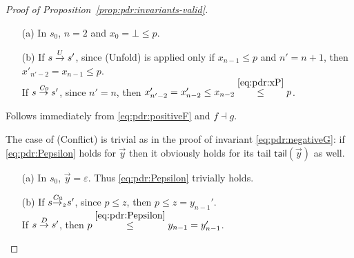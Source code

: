 \begin{proof}[Proof of Proposition~\ref{prop:pdr:invariants-valid}]
	\begin{itemize}
		\item[(a)] In $s_0$, $n=2$ and $x_{0}= \bot \leq p$.
		\item[(b)] If $s \stackrel{U}{\to} s'$, since (Unfold) is applied only if $x_{n-1}\leq p$ and $n'=n+1$, then $x'_{n'-2}=x_{n-1} \leq p$. \\
		      If $s \stackrel{\mathit{Co}}{\to} s'$, since $n'=n$, then $x_{n'-2}'= x_{n-2}'  \leq x_{n-2} \stackrel{{\eqref{eq:pdr:xP}}}{\leq} p$.
	\end{itemize}

	\newline\noindent
	Follows immediately from \eqref{eq:pdr:positiveF} and $f \dashv g$.

	\newline\noindent
	The case of (Conflict) is trivial as in the proof of invariant \eqref{eq:pdr:negativeG}: if \eqref{eq:pdr:Pepsilon} holds for $\vec{y}$ then it obviously holds for its tail $\mathsf{tail}(\vec{y})$ as well.
	\begin{itemize}
		\item[(a)] In $s_0$, $\vec{y}= \varepsilon$. Thus \eqref{eq:pdr:Pepsilon} trivially holds.
		\item[(b)] If $s {\stackrel{\mathit{Ca}}{\to}}_{z} s'$, since $p\leq z$, then $p \leq z = y_{n-1}'$.\\
		      If $s \stackrel{D}{\to} s'$, then $p \stackrel{{\eqref{eq:pdr:Pepsilon}}}{\leq} y_{n-1}=y'_{n-1}$.
	\end{itemize}


\end{proof}
